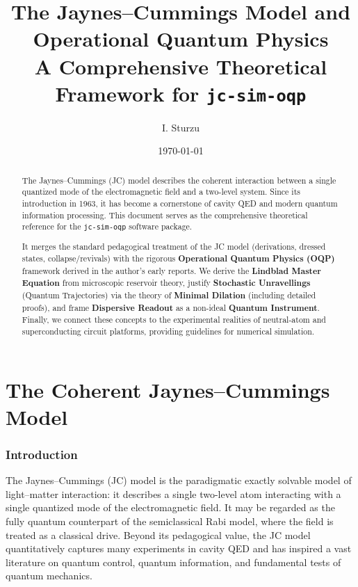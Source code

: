 \documentclass[11pt,a4paper]{article}
\title{\textbf{The Jaynes--Cummings Model and Operational Quantum Physics}\\
\large A Comprehensive Theoretical Framework for \texttt{jc-sim-oqp}}
\author{I. Sturzu}
\date{\today}
\theoremstyle{definition}
\begin{document}
\maketitle

\begin{abstract}
The Jaynes--Cummings (JC) model describes the coherent interaction between a single quantized mode of the electromagnetic field and a two-level system. Since its introduction in 1963, it has become a cornerstone of cavity QED and modern quantum information processing. This document serves as the comprehensive theoretical reference for the \texttt{jc-sim-oqp} software package.

It merges the standard pedagogical treatment of the JC model (derivations, dressed states, collapse/revivals) with the rigorous \textbf{Operational Quantum Physics (OQP)} framework derived in the author's early reports. We derive the \textbf{Lindblad Master Equation} from microscopic reservoir theory, justify \textbf{Stochastic Unravellings} (Quantum Trajectories) via the theory of \textbf{Minimal Dilation} (including detailed proofs), and frame \textbf{Dispersive Readout} as a non-ideal \textbf{Quantum Instrument}. Finally, we connect these concepts to the experimental realities of neutral-atom and superconducting circuit platforms, providing guidelines for numerical simulation.
\end{abstract}

\tableofcontents
\newpage

\part{The Coherent Jaynes--Cummings Model}

\section{Introduction}

The Jaynes--Cummings (JC) model is the paradigmatic exactly solvable model of light--matter interaction: it describes a single two-level atom interacting with a single quantized mode of the electromagnetic field.\cite{JaynesCummings1963ProcIEEE}
It may be regarded as the fully quantum counterpart of the semiclassical Rabi model, where the field is treated as a classical drive.
Beyond its pedagogical value, the JC model quantitatively captures many experiments in cavity QED and has inspired a vast literature on quantum control, quantum information, and fundamental tests of quantum mechanics.
\end{document}
